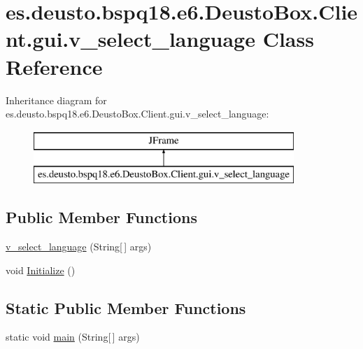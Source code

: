 \hypertarget{classes_1_1deusto_1_1bspq18_1_1e6_1_1_deusto_box_1_1_client_1_1gui_1_1v__select__language}{}\section{es.\+deusto.\+bspq18.\+e6.\+Deusto\+Box.\+Client.\+gui.\+v\+\_\+select\+\_\+language Class Reference}
\label{classes_1_1deusto_1_1bspq18_1_1e6_1_1_deusto_box_1_1_client_1_1gui_1_1v__select__language}
Inheritance diagram for es.\+deusto.\+bspq18.\+e6.\+Deusto\+Box.\+Client.\+gui.\+v\+\_\+select\+\_\+language\+:\begin{figure}[H]
\begin{center}
\leavevmode
\includegraphics[height=2.000000cm]{classes_1_1deusto_1_1bspq18_1_1e6_1_1_deusto_box_1_1_client_1_1gui_1_1v__select__language}
\end{center}
\end{figure}
\subsection*{Public Member Functions}
\begin{DoxyCompactItemize}
\item 
\mbox{\hyperlink{classes_1_1deusto_1_1bspq18_1_1e6_1_1_deusto_box_1_1_client_1_1gui_1_1v__select__language_a4913cc187044a3296a605736d367e1db}{v\+\_\+select\+\_\+language}} (String\mbox{[}$\,$\mbox{]} args)
\item 
void \mbox{\hyperlink{classes_1_1deusto_1_1bspq18_1_1e6_1_1_deusto_box_1_1_client_1_1gui_1_1v__select__language_a631b5a16cc3a831763a681661174c54f}{Initialize}} ()
\end{DoxyCompactItemize}
\subsection*{Static Public Member Functions}
\begin{DoxyCompactItemize}
\item 
static void \mbox{\hyperlink{classes_1_1deusto_1_1bspq18_1_1e6_1_1_deusto_box_1_1_client_1_1gui_1_1v__select__language_abff2080b5331d2fb16c01d89328f81dd}{main}} (String\mbox{[}$\,$\mbox{]} args)
\end{DoxyCompactItemize}



